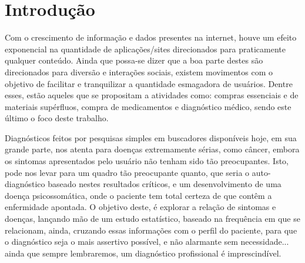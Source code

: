 \section{Introdução}

Com o crescimento de informação e dados presentes na internet, houve um efeito exponencial na quantidade de aplicações/sites direcionados para praticamente qualquer conteúdo.
Ainda que possa-se dizer que a boa parte destes são direcionados para diversão e interações sociais, existem movimentos com o objetivo de facilitar e tranquilizar a quantidade esmagadora de usuários. Dentre esses, estão aqueles que se propositam a atividades como: compras essenciais e de materiais supérfluos, compra de medicamentos e  diagnóstico médico, sendo este último o foco deste trabalho.

Diagnósticos feitos por pesquisas simples em buscadores disponíveis hoje, em sua grande parte, nos atenta para doenças extremamente sérias, como câncer, embora os sintomas apresentados pelo usuário não tenham sido tão preocupantes.
Isto, pode nos levar para um quadro tão preocupante quanto, que seria o auto-diagnóstico baseado nestes resultados críticos, e um desenvolvimento de uma doença psicossomática, onde o paciente tem total certeza de que contêm a enfermidade apontada.
O objetivo deste, é explorar a relação de sintomas e doenças, lançando mão de um estudo estatístico, baseado na frequência em que se relacionam, ainda, cruzando essas informações com o perfil do paciente, para que o diagnóstico seja o mais assertivo possível, e não alarmante sem necessidade... ainda que sempre lembraremos, um diagnóstico profissional é imprescindível.